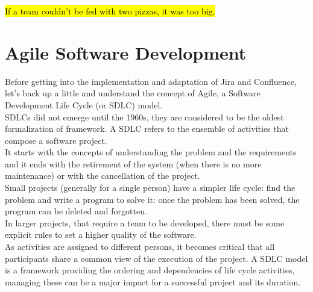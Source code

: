 \begin{savequote}[75mm]
\hl{If a team couldn’t be fed with two pizzas, it was too big.}
\end{savequote}


\chapter{Agile Software Development}

Before getting into the implementation and adaptation of Jira and Confluence, let's back up a little and understand the concept of Agile, a Software Development Life Cycle (or SDLC) model.\\
SDLCs did not emerge until the 1960s, they are considered to be the oldest formalization of framework.
A SDLC refers to the ensemble of activities that compose a software project.\\
It starts with the concepts of understanding the problem and the requirements and it ends with the retirement of the system (when there is no more maintenance) or with the cancellation of the project.\\
Small projects (generally for a single person) have a simpler life cycle: find the problem and write a program to solve it: once the problem has been solved, the program can be deleted and forgotten.\\
In larger projects, that require a team to be developed, there must be some explicit rules to set a higher quality of the software.\\
As activities are assigned to different persons, it becomes critical that all participants share a common view of the execution of the project.
A SDLC model is a framework providing the ordering and dependencies of life cycle activities, 
managing these can be a major impact for a successful project and its duration.\\

